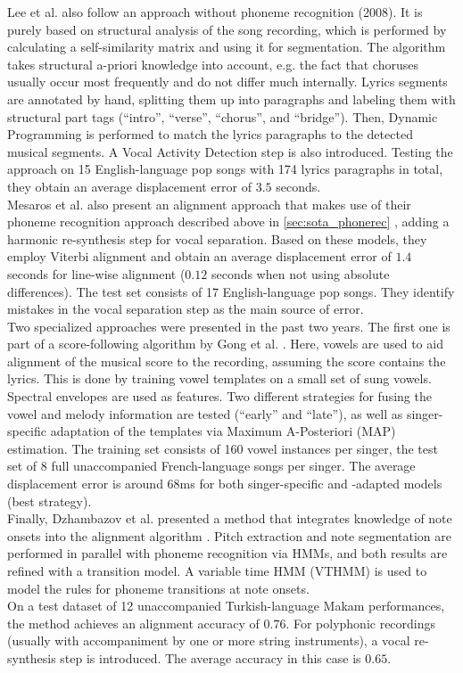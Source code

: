 Lee et al. also follow an approach without phoneme recognition \cite{LeeC08} (2008). It is purely based on structural analysis of the song recording, which is performed by calculating a self-similarity matrix and using it for segmentation. The algorithm takes structural a-priori knowledge into account, e.g. the fact that choruses usually occur most frequently and do not differ much internally. Lyrics segments are annotated by hand, splitting them up into paragraphs and labeling them with structural part tags (``intro'', ``verse'', ``chorus'', and ``bridge''). Then, Dynamic Programming is performed to match the lyrics paragraphs to the detected musical segments. A Vocal Activity Detection step is also introduced. Testing the approach on 15 English-language pop songs with 174 lyrics paragraphs in total, they obtain an average displacement error of $3.5$ seconds.\\ %

Mesaros et al. also present an alignment approach that makes use of their phoneme recognition approach described above in \ref{sec:sota_phonerec} \cite{mesaros_alignment}, adding a harmonic re-synthesis step for vocal separation. Based on these models, they employ Viterbi alignment and obtain an average displacement error of $1.4$ seconds for line-wise alignment ($0.12$ seconds when not using absolute differences). The test set consists of 17 English-language pop songs. They identify mistakes in the vocal separation step as the main source of error.\\ %

Two specialized approaches were presented in the past two years. The first one is part of a score-following algorithm by Gong et al. \cite{gong_alignment}. Here, vowels are used to aid alignment of the musical score to the recording, assuming the score contains the lyrics. This is done by training vowel templates on a small set of sung vowels. Spectral envelopes are used as features. Two different strategies for fusing the vowel and melody information are tested (``early'' and ``late''), as well as singer-specific adaptation of the templates via Maximum A-Posteriori (MAP) estimation. The training set consists of 160 vowel instances per singer, the test set of 8 full unaccompanied French-language songs per singer.  The average displacement error is around 68ms for both singer-specific and -adapted models (best strategy).\\

Finally, Dzhambazov et al. presented a method that integrates knowledge of note onsets into the alignment algorithm \cite{dzhambazov_alignment}. Pitch extraction and note segmentation are performed in parallel with phoneme recognition via HMMs, and both results are refined with a transition model. A variable time HMM (VTHMM) is used to model the rules for phoneme transitions at note onsets.\\
On a test dataset of 12 unaccompanied Turkish-language Makam performances, the method achieves an alignment accuracy of $0.76$. For polyphonic recordings (usually with accompaniment by one or more string instruments), a vocal re-synthesis step is introduced. The average accuracy in this case is $0.65$.




